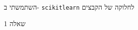 \documentclass[11pt]{article}
\begin{document}
השתמשתי ב-
\texttt{scikitlearn}
    לחלוקה של הקבצים


    שאלה 1
\end{document}

